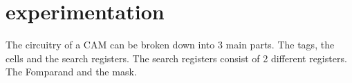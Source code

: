 \section{experimentation}
The circuitry of a CAM can be broken down into 3 main parts. The tags, the cells and the search registers. 
The search registers consist of 2 different registers. The Fomparand and the mask. 